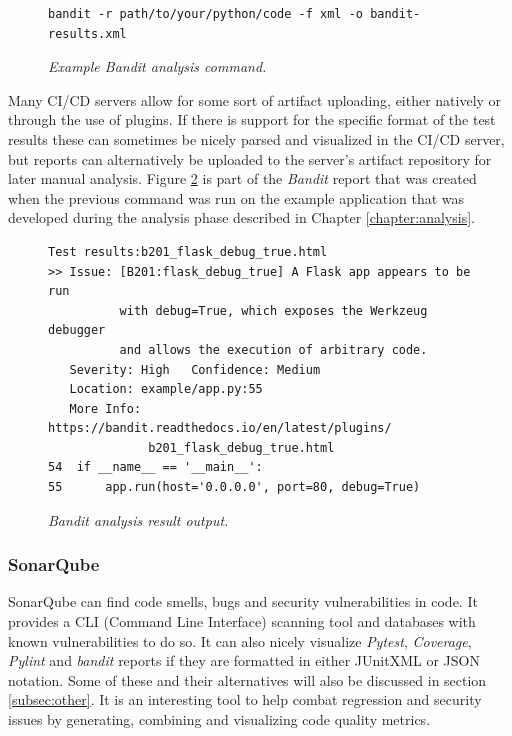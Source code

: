 \begin{figure}[H]
\centering
\begin{lstlisting}[frame=single, basicstyle=\small, linewidth=\textwidth]
bandit -r path/to/your/python/code -f xml -o bandit-results.xml 
\end{lstlisting}
\caption{\textit{Example Bandit analysis command.}}
\label{fig:bandit-command}
\end{figure}
Many CI/CD servers allow for some sort of artifact uploading, either natively or through the use of plugins. If there is support for the specific format of the test results these can sometimes be nicely parsed and visualized in the CI/CD server, but reports can alternatively be uploaded to the server's artifact repository for later manual analysis. Figure \ref{fig:bandit-output} is part of the \textit{Bandit} report that was created when the previous command was run on the example application that was developed during the analysis phase described in Chapter \ref{chapter:analysis}.

\begin{figure}[H]
\centering
\begin{lstlisting}[frame=single, basicstyle=\small, linewidth=\textwidth]
Test results:b201_flask_debug_true.html
>> Issue: [B201:flask_debug_true] A Flask app appears to be run 
          with debug=True, which exposes the Werkzeug debugger 
          and allows the execution of arbitrary code.
   Severity: High   Confidence: Medium
   Location: example/app.py:55
   More Info: https://bandit.readthedocs.io/en/latest/plugins/
              b201_flask_debug_true.html
54	if __name__ == '__main__':
55	    app.run(host='0.0.0.0', port=80, debug=True)
\end{lstlisting}
\caption{\textit{Bandit analysis result output.}}
\label{fig:bandit-output}
\end{figure}

\subsubsection{SonarQube}
SonarQube can find code smells, bugs and security vulnerabilities in code.\cite{sonarqube} It provides a CLI (Command Line Interface) scanning tool and databases with known vulnerabilities to do so. It can also nicely visualize \textit{Pytest}, \textit{Coverage}, \textit{Pylint} and \textit{bandit} reports if they are formatted in either JUnitXML or JSON notation. Some of these and their alternatives will also be discussed in section \ref{subsec:other}. It is an interesting tool to help combat regression and security issues by generating, combining and visualizing code quality metrics. 


